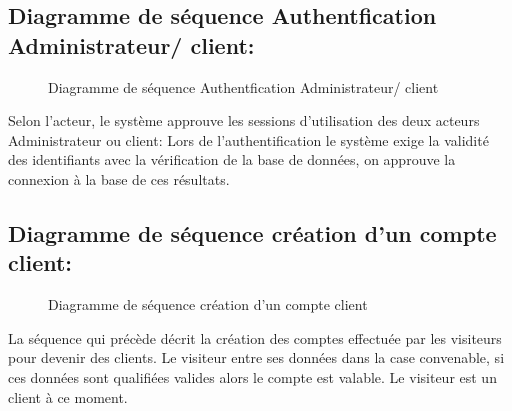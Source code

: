 \documentclass[a4paper]{report}
\begin{document}
\begin{doublespace}
\begin{doublespace}
\begin{doublespace}
\begin{doublespace}
\begin{doublespace}
                    \subsection{Diagramme de séquence Authentfication Administrateur/ client:}
                    \begin{figure}[H]
                        \begin{center}
                            \caption{Diagramme de séquence Authentfication Administrateur/ client}
                        \end{center}
                    \end{figure}
                    Selon l'acteur, le système approuve les sessions d'utilisation des deux acteurs Administrateur ou client: Lors de l'authentification le système exige la validité des identifiants avec la vérification de la base de données, on approuve la connexion à la base de ces résultats.
                    \subsection{Diagramme de séquence création d'un compte client:}
                    \begin{figure}[H]
                        \begin{center}
                            \caption{Diagramme de séquence création d'un compte client}
                        \end{center}
                    \end{figure}
                    La séquence  qui précède décrit la création des comptes effectuée par les visiteurs pour devenir des clients. Le visiteur entre ses données dans la case convenable, si ces données sont qualifiées valides alors le compte est valable. Le visiteur est un client à ce moment.

\end{doublespace}
\end{doublespace}
\end{doublespace}
\end{doublespace}
\end{doublespace}
\end{document}
